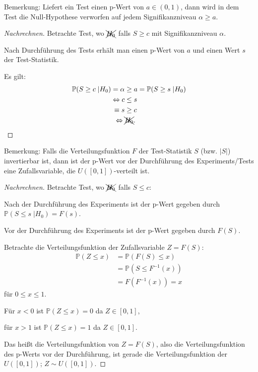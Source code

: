 \documentclass{tstextbook}
\newcommand{\Prob}{\mathbb P}
\begin{document}
\begin{remark}
	Bemerkung: Liefert ein Test einen p-Wert von $ a\in(0,1) $, dann wird in dem Test die Null-Hypothese verworfen auf jedem Signifikanzniveau $ \alpha\ge a $.
\end{remark}

\begin{proof}[Nachrechnen]
	Betrachte Test, wo $ \xcancel{H_0} $ falls $ S\ge c $ mit Signifikanzniveau $ \alpha $. 
	
	Nach Durchführung des Tests erhält man einen p-Wert von $ a $ und einen Wert $ s $ der Test-Statistik. 
	
	Es gilt: 
	\[
	\begin{aligned}
		\Prob(S\ge c\; |H_0) = \alpha & \ge a = \Prob(S\ge s\; |H_0) \\
		\Leftrightarrow c & \le s \\
		\equiv s & \ge c \\
		\Leftrightarrow \; & \xcancel{H_0}.
	\end{aligned}
	\]
\end{proof}

\begin{remark}
	Bemerkung: Falls die Verteilungsfunktion $ F $ der Test-Statistik $ S $ (bzw. $ |S| $) invertierbar ist, dann ist der p-Wert vor der Durchführung des Experiments/Tests eine Zufallsvariable, die $ U([0,1]) $-verteilt ist.
\end{remark}

\begin{proof}[Nachrechnen]
	Betrachte Test, wo $ \xcancel{H_0} $ falls $ S\le c $: 
	
	Nach der Durchführung des Experiments ist der p-Wert gegeben durch $ \Prob(S\le s \; |H_0)=F(s) $. 
	
	Vor der Durchführung des Experiments ist der p-Wert gegeben durch $ F(S) $.
	
	Betrachte die Verteilungsfunktion der Zufallsvariable $ Z=F(S) $:
	\[
	\begin{aligned}
		\Prob(Z\le x) & = \Prob(F(S)\le x) \\
		& = \Prob(S\le F^{-1}(x)) \\
		& = F(F^{-1}(x))=x
	\end{aligned}
	\]
	für $ 0\le x \le 1 $. 
	
	Für $ x<0 $ ist $ \Prob(Z\le x)=0 $ da $ Z\in[0,1] $,
	
	für $ x>1 $ ist $ \Prob(Z\le x)=1 $ da $ Z\in[0,1] $.
	
	Das heißt die Verteilungsfunktion von $ Z=F(S) $, also die Verteilungsfunktion des p-Werts vor der Durchführung, ist gerade die Verteilungsfunktion der $ U([0,1]) $; $ Z\sim U([0,1]) $.
\end{proof}
\end{document}
